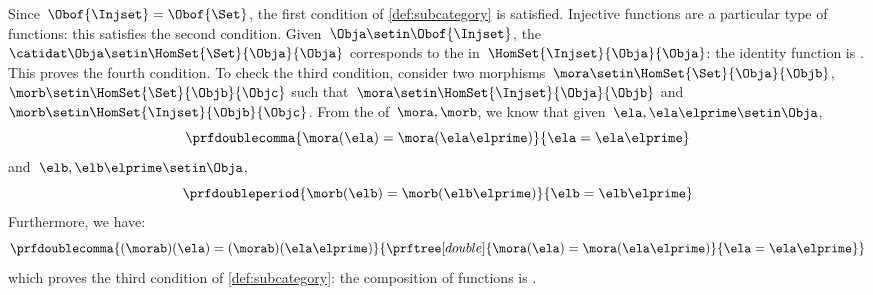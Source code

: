 {\begin{example}
    Since~$\Obof{\Injset}=\Obof{\Set}$, the first condition of \cref{def:subcategory} is satisfied.
    Injective functions are a particular type of functions: this satisfies the second condition.
    Given~$\Obja\setin \Obof{\Injset}$, the ~$\catidat\Obja\setin \HomSet{\Set}{\Obja}{\Obja}$ corresponds to the  in~$\HomSet{\Injset}{\Obja}{\Obja}$: the identity function is .
    This proves the fourth condition.
    To check the third condition, consider two morphisms~$\mora \setin \HomSet{\Set}{\Obja}{\Objb}$,~$\morb \setin \HomSet{\Set}{\Objb}{\Objc}$ such that~$\mora \setin \HomSet{\Injset}{\Obja}{\Objb}$ and~$\morb\setin \HomSet{\Injset}{\Objb}{\Objc}$.
    From the  of~$\mora,\morb$, we know that given~$\ela,\ela\elprime\setin \Obja$,
    \begin{equation}
        \prfdoublecomma{
            \mora(\ela)=\mora(\ela\elprime)
        }{
            \ela=\ela\elprime
        }
    \end{equation}
    and~$\elb,\elb\elprime\setin \Obja$,
    \begin{equation}
        \prfdoubleperiod{
            \morb(\elb)=\morb(\elb\elprime)
        }{
            \elb=\elb\elprime
        }
    \end{equation}
    Furthermore, we have:
    \begin{equation}
        \prfdoublecomma{
            (\morab)(\ela)
            =(\morab)(\ela\elprime)
        }{
            \prftree[double]{
                \mora(\ela)=\mora(\ela\elprime)
            }{
                \ela=\ela\elprime
            }
        }
    \end{equation}
    which proves the third condition of \cref{def:subcategory}: the composition of  functions is .
\end{example}

}
